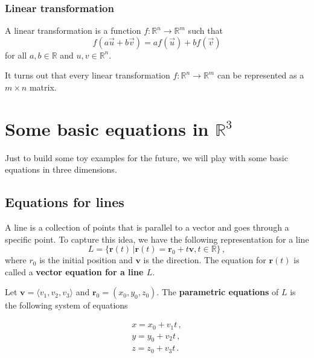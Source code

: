 \documentclass[
]{book}
\theoremstyle{definition}
\theoremstyle{definition}
\theoremstyle{definition}
\theoremstyle{definition}
\theoremstyle{remark}
\begin{document}
\hypertarget{linear-transformation}{%
\subsection{Linear transformation}\label{linear-transformation}}

A linear transformation is a function \(f: \mathbb{R}^n \to \mathbb{R}^m\) such that
\[ f(a \vec{u} + b \vec{v} ) = a f(\vec{u}) + b f(\vec{v}) \]
for all \(a,b \in \mathbb{R}\) and \(u,v \in \mathbb{R}^n\).

It turns out that every linear transformation \(f: \mathbb{R}^n \to \mathbb{R}^m\)
can be represented as a \(m\times n\) matrix.

\newpage

\hypertarget{some-basic-equations-in-mathbbr3}{%
\chapter{\texorpdfstring{Some basic equations in \(\mathbb{R}^3\)}{Some basic equations in \textbackslash mathbb\{R\}\^{}3}}\label{some-basic-equations-in-mathbbr3}}

Just to build some toy examples for the future, we will play with some basic
equations in three dimensions.

\hypertarget{equations-for-lines}{%
\section{Equations for lines}\label{equations-for-lines}}

A line is a collection of points that is parallel to a vector and goes through a
specific point.
To capture this idea, we have the following representation for a line
\begin{equation*}
    L = \{\mathbf{r}(t) \,|  \mathbf{r}(t) = \mathbf{r}_0 + t \mathbf{v}, t\in \mathbb{R}\}  \,,
\end{equation*}
where \({r}_0\) is the initial position and \(\mathbf{v}\) is the direction.
The equation for \(\mathbf{r}(t)\) is called a \textbf{vector equation for a line \(L\)}.

Let \(\mathbf{v} = \langle v_1, v_2, v_3 \rangle\) and \(\mathbf{r}_0 = ( x_0, y_0, z_0 )\).
The \textbf{parametric equations} of \(L\) is the following system of equations

\begin{gather*}
    x = x_0 + v_1 t\,, \\
    y = y_0 + v_2 t\,, \\
    z = z_0 + v_3 t \,. 
\end{gather*}
\end{document}
